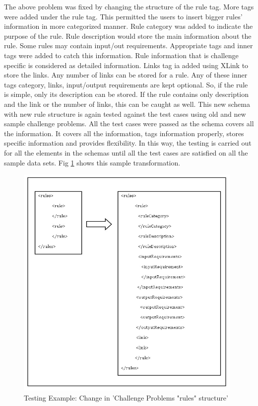 \documentclass[11pt,letterpaper]{report}
\begin{document}
The above problem was fixed by changing the structure of the rule tag. More tags were added under the rule tag. This permitted the users to insert bigger rules' information in more categorized manner. Rule category was added to indicate the purpose of the rule. Rule description would store the main information about the rule. Some rules may contain input/out requirements. Appropriate tags and inner tags were added to catch this information. Rule information that is challenge specific is considered as detailed information. Links tag ia added using XLink to store the links. Any number of links can be stored for a rule. Any of these inner tags category, links, input/output requirements are kept optional. So, if the rule is simple, only its description can be stored. If the rule contains only description and the link or the number of links, this can be caught as well. This new schema with new rule structure is again tested against the test cases using old and new sample challenge problems. All the test cases were passed as the schema covers all the information. It covers all the information, tags information properly, stores specific information and provides flexibility. In this way, the testing is carried out for all the elements in the schemas until all the test cases are satisfied on all the sample data sets. Fig \ref{Fig:2} shows this sample transformation.    
\begin{figure}[ht]
\centering
\includegraphics[width=110mm]{Images/rules.jpg}
\caption{Testing Example: Change in 'Challenge Problems "rules" structure'}
\label{Fig:2}
\end{figure}
\end{document}
